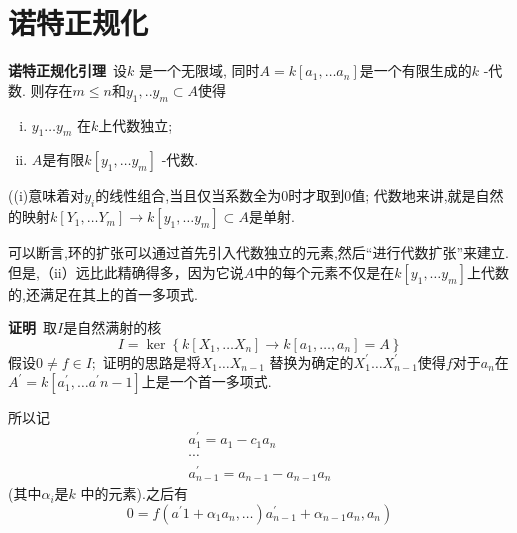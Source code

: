 \documentclass[UTF8]{book}
\begin{document}
		
	\section{诺特正规化}
		\textbf{诺特正规化引理}\ 设$k$ 是一个无限域, 同时$A=k\left[a_{1}, \ldots a_{n}\right]$是一个有限生成的$k$ -代数. 则存在$m \leq n$和$y_{1}, . . y_{m} \subset A$使得
		\begin{enumerate}[(i)]
			\item  $y _{1} \ldots y _{ m }$ 在$k$上代数独立;
			\item $A$是有限$k \left[ y _{1}, \dots y _{ m }\right]$ -代数.
		\end{enumerate}
		
		
		((i)意味着对$y_{i}$的线性组合,当且仅当系数全为0时才取到0值; 代数地来讲,就是自然的映射$k \left[ Y _{1}, \ldots Y _{ m }\right] \rightarrow k \left[ y _{1}, \ldots y _{ m }\right] \subset A$是单射.
		
		可以断言,环的扩张可以通过首先引入代数独立的元素,然后“进行代数扩张”来建立.但是,（ii）远比此精确得多，因为它说$ A $中的每个元素不仅是在$ k \left [y _ {1},\ldots y _ {m} \right]$上代数的,还满足在其上的首一多项式.
		
		
		
		\textbf{证明}\ 取$ I $是自然满射的核
		\begin{equation*}
		I =\operatorname{ker}\left\{ k \left[ X _{1}, \ldots X _{ n }\right] \rightarrow k \left[ a _{1}, \ldots, a _{n}\right]= A \right\}
		\end{equation*}
		假设$0 \neq f \in I ;$ 证明的思路是将$X _{1} \ldots X _{ n -1}$ 替换为确定的$X _{1}^{\prime} \ldots X _{ n -1}^{\prime}$使得$f$对于$a _{ n }$在$A ^{\prime}= k \left[ a _{1}^{\prime}, \ldots a ^{\prime} n -1\right]$上是一个首一多项式.
		
		
		
		所以记
		\begin{equation*}
		\begin{array}{c}
		{ a _{1}^{\prime}= a _{1}- c _{1} a _{ n }} \\
		{\cdots} \\
		{ a _{ n -1}^{\prime}= a _{ n -1}- a _{ n -1} a _{ n }}
		\end{array}
		\end{equation*}
		(其中$\alpha_{i}$是$k$ 中的元素).之后有
		\begin{equation*}
		\left.0= f \left(a ^{\prime} 1+\alpha_{1} a _{ n }, \ldots\right) a _{ n -1}^{\prime}+\alpha_{ n -1} a _{ n }, a _{ n }\right)
		\end{equation*}
		
\end{document}

